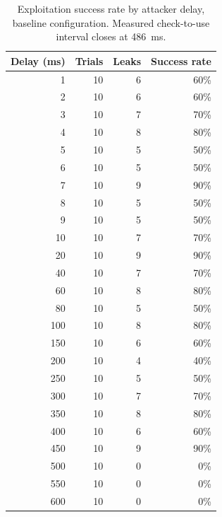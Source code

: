 \begin{table}[ht]
\centering
\begin{tabular}{rrrr}
\hline
Delay (ms) & Trials & Leaks & Success rate \\
\hline
1 & 10 & 6 & 60\% \\
2 & 10 & 6 & 60\% \\
3 & 10 & 7 & 70\% \\
4 & 10 & 8 & 80\% \\
5 & 10 & 5 & 50\% \\
6 & 10 & 5 & 50\% \\
7 & 10 & 9 & 90\% \\
8 & 10 & 5 & 50\% \\
9 & 10 & 5 & 50\% \\
10 & 10 & 7 & 70\% \\
20 & 10 & 9 & 90\% \\
40 & 10 & 7 & 70\% \\
60 & 10 & 8 & 80\% \\
80 & 10 & 5 & 50\% \\
100 & 10 & 8 & 80\% \\
150 & 10 & 6 & 60\% \\
200 & 10 & 4 & 40\% \\
250 & 10 & 5 & 50\% \\
300 & 10 & 7 & 70\% \\
350 & 10 & 8 & 80\% \\
400 & 10 & 6 & 60\% \\
450 & 10 & 9 & 90\% \\
500 & 10 & 0 & 0\% \\
550 & 10 & 0 & 0\% \\
600 & 10 & 0 & 0\% \\
\hline
\end{tabular}
\caption{Exploitation success rate by attacker delay, baseline configuration. Measured check-to-use interval closes at 486~ms.}
\label{tab:success-baseline}
\end{table}
